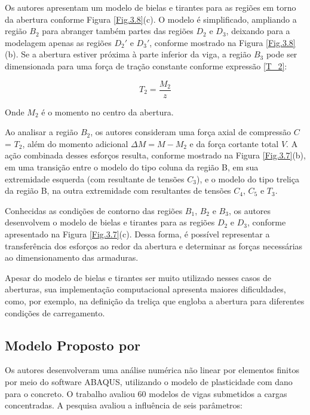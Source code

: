 Os autores apresentam um modelo de bielas e tirantes para as regiões em torno da abertura conforme Figura \ref{Fig.3.8}(c). O modelo é simplificado, ampliando a região $B_{2}$ para abranger também partes das regiões $D_{2}$ e $D_{3}$, deixando para a modelagem apenas as regiões $D_{2}'$ e $D_{3}'$, conforme mostrado na Figura \ref{Fig.3.8}(b). Se a abertura estiver próxima à parte inferior da viga, a região $B_{3}$ pode ser dimensionada para uma força de tração constante conforme expressão \ref{T_2}:

\begin{equation}
    {T_2} = \frac{M_2}{z}
    \label{T_2}
\end{equation}

Onde $M_{2}$ é o momento no centro da abertura.

Ao analisar a região $B_{2}$, os autores consideram uma força axial de compressão $C$ = $T_{2}$, além do momento adicional $\Delta M = M - M_{2}$ e da força cortante total $V$. 
A ação combinada desses esforços resulta, conforme mostrado na Figura \ref{Fig.3.7}(b), em uma transição entre o modelo do tipo coluna da região B, em sua extremidade esquerda (com resultante de tensões $C_{3}$), 
e o modelo do tipo treliça da região B, 
na outra extremidade com resultantes de tensões $C_{4}$, $C_{5}$ e $T_{3}$.

Conhecidas as condições de contorno das regiões $B_{1}$, $B_{2}$ e $B_{3}$, os autores desenvolvem o modelo de bielas e tirantes para as regiões $D_{2}$ e $D_{3}$, conforme apresentado na Figura \ref{Fig.3.7}(c). Dessa forma, é possível representar a transferência dos esforços ao redor da abertura e determinar as forças necessárias ao dimensionamento das armaduras.

Apesar do modelo de bielas e tirantes ser muito utilizado nesses casos de aberturas, sua implementação computacional apresenta maiores dificuldades, como, por exemplo, na definição da treliça que engloba a abertura para diferentes condições de carregamento.

\subsection{Modelo Proposto por }

Os autores desenvolveram uma análise numérica não linear por elementos finitos por meio do software ABAQUS, utilizando o modelo de plasticidade com dano para o concreto. O trabalho avaliou 60 modelos de vigas submetidos a cargas concentradas. A pesquisa avaliou a influência de seis parâmetros:

